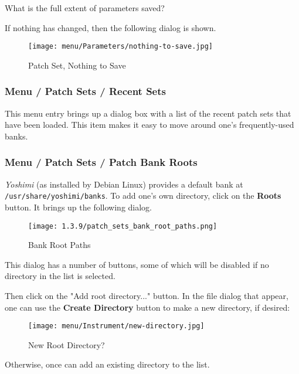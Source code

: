    What is the full extent of parameters saved?

   If nothing has changed, then the following dialog is shown.

\begin{figure}[H]
   \centering 
   \texttt{[image: menu/Parameters/nothing-to-save.jpg]}
   \caption{Patch Set, Nothing to Save}
   \label{fig:yoshimi_menu_nothing_to_save_parameters}
\end{figure}

\subsubsection{Menu / Patch Sets / Recent Sets}
\label{subsubsec:menu_patch_sets_recent_sets}

   This menu entry brings up a dialog box with a list of the recent patch sets
   that have been loaded.  This item makes it easy to move around one's
   frequently-used banks.

\subsubsection{Menu / Patch Sets / Patch Bank Roots}
\label{subsubsec:menu_patch_sets_patch_bank_roots}

   \textsl{Yoshimi} (as installed by Debian Linux) provides a default bank at
   \texttt{/usr/share/yoshimi/banks}.
   To add one's own directory, click on the \textbf{Roots} button.
   It brings up the following dialog.

\begin{figure}[H]
   \centering 
   \texttt{[image: 1.3.9/patch\_sets\_bank\_root\_paths.png]}
   \caption{Bank Root Paths}
   \label{fig:bank_root_paths}
\end{figure}

   This dialog has a number of buttons, some of which will be disabled if no
   directory in the list is selected.

   Then click on the "Add root directory..." button.  In the file dialog that
   appear, one can use the \textbf{Create Directory} button to make a new
   directory, if desired:

\begin{figure}[H]
   \centering 
   \texttt{[image: menu/Instrument/new-directory.jpg]}
   \caption{New Root Directory?}
   \label{fig:new_root_directory}
\end{figure}

   Otherwise, once can add an existing directory to the list.

